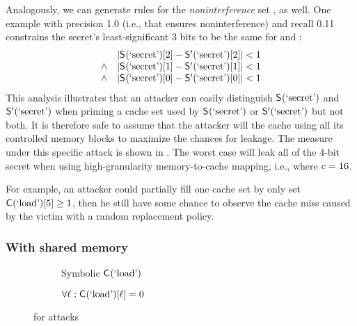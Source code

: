 Analogously, we can generate rules for the \textit{noninterference}
set \noninterferenceSet, as well.  One example with precision 1.0
(i.e., that ensures noninterference) and recall 0.11 constrains the
secret's least-significant 3 bits to be the same for \SecFn{} and
\SecFnAlt{}:
\begin{align}
  \begin{array}{rr}
  & |\mathsf{S}_{}(\textrm{`secret'})[2]-\mathsf{S}'_{}(\textrm{`secret'})[2]|< 1 \\
  \wedge & |\mathsf{S}_{}(\textrm{`secret'})[1]-\mathsf{S}'_{}(\textrm{`secret'})[1]|< 1 \\
  \wedge & |\mathsf{S}_{}(\textrm{`secret'})[0]-\mathsf{S}'_{}(\textrm{`secret'})[0]|< 1
  \end{array}
  \label{eqn:prime-probe-noninterference}
\end{align}
This analysis illustrates that an attacker can easily distinguish
$\mathsf{S}_{}(\textrm{`secret'})$ and $\mathsf{S}'_{}(\textrm{`secret'})$ when priming a
cache set used by $\mathsf{S}_{}(\textrm{`secret'})$ or $\mathsf{S}'_{}(\textrm{`secret'})$
but not both.  It is therefore safe to assume that the attacker will
\Prime the cache using all its controlled memory blocks to maximize
the chances for leakage.  The \JaccardRand{ \secretsSetSize} measure
under this specific attack is shown in
. The worst case will leak all
of the 4-bit secret when using high-granularity memory-to-cache
mapping, i.e., where $c=16$.

\if
For
example, an attacker could partially fill one cache set by only set
$\mathsf{C}_{}(\textrm{`load'})[5]\ge 1$, then he still have some chance to observe
the cache miss caused by the victim with a random replacement policy.
\fi
 
\subsubsection{With shared memory}

\begin{figure}
\begin{subfigure}[t]{0.495\linewidth}
\resizebox{\linewidth}{!}{\protect\small}
\caption{Symbolic $\mathsf{C}_{}(\textrm{`load'})$ \label{fig:normalcache:jaccard:sharedsymloads}
}
\end{subfigure}%
\begin{subfigure}[t]{0.495\linewidth}
\resizebox{\linewidth}{!}{\protect\small}
\caption{$\forall \ell: \mathsf{C}_{}(\textrm{`load'})[\ell] = 0$
  \label{fig:normalcache:jaccard:flushreload}
}
\end{subfigure}%
\caption{\JaccardRand{\secretsSetSize} for \flushreload attacks}
\end{figure}


